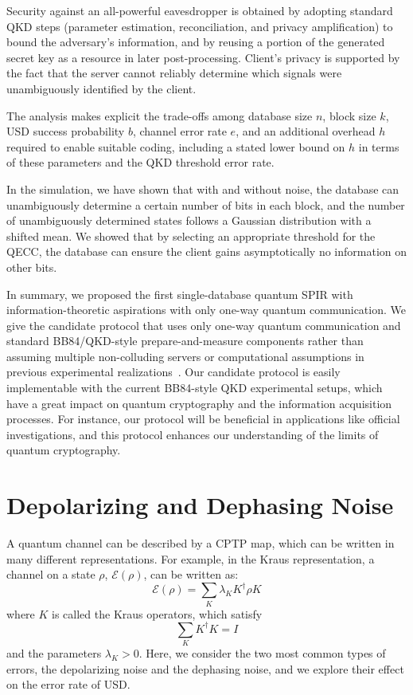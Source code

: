 \documentclass[%
 reprint,
superscriptaddress,
 amsmath,amssymb,
 aps,
]{revtex4-2}
\begin{document}
Security against an all-powerful eavesdropper is obtained by adopting standard QKD steps (parameter estimation, reconciliation, and privacy amplification) to bound the adversary's information, and by reusing a portion of the generated secret key as a resource in later post-processing. Client's privacy is supported by the fact that the server cannot reliably determine which signals were unambiguously identified by the client.

The analysis makes explicit the trade-offs among database size $n$, block size $k$, USD success probability $b$, channel error rate $e$, and an additional overhead $h$ required to enable suitable coding, including a stated lower bound on $h$ in terms of these parameters and the QKD threshold error rate. 

In the simulation, we have shown that with and without noise, the database can unambiguously determine a certain number of bits in each block, and the number of unambiguously determined states follows a Gaussian distribution with a shifted mean. We showed that by selecting an appropriate threshold for the QECC, the database can ensure the client gains asymptotically no information on other bits.

In summary, we proposed the first single-database quantum SPIR with information-theoretic aspirations with only one-way quantum communication. We give the candidate protocol that uses only one-way quantum communication and standard BB84/QKD-style prepare-and-measure components rather than assuming multiple non-colluding servers or computational assumptions in previous experimental realizations~\cite{QSPIR_multiple_database1, QSPIR_multiple_database2, QSPIR_theory1}. Our candidate protocol is easily implementable with the current BB84-style QKD experimental setups, which have a great impact on quantum cryptography and the information acquisition processes. For instance, our protocol will be beneficial in applications like official investigations, and this protocol enhances our understanding of the limits of quantum cryptography.



\appendix

\section{Depolarizing and Dephasing Noise}
\label{sec:Depolarizing_and_Dephasing_Noise}

A quantum channel can be described by a CPTP map, which can be written in many different representations. For example, in the Kraus representation, a channel on a state $\rho$, $\mathcal{E}(\rho)$, can be written as:
\begin{equation}
    \mathcal{E}(\rho)=\sum_K \lambda_K K^\dagger\rho K
\end{equation}
where $K$ is called the Kraus operators, which satisfy 
\begin{equation}
    \sum_KK^\dagger K=I
\end{equation}
and the parameters $\lambda_K>0$.
Here, we consider the two most common types of errors, the depolarizing noise and the dephasing noise, and we explore their effect on the error rate of USD.
\end{document}
